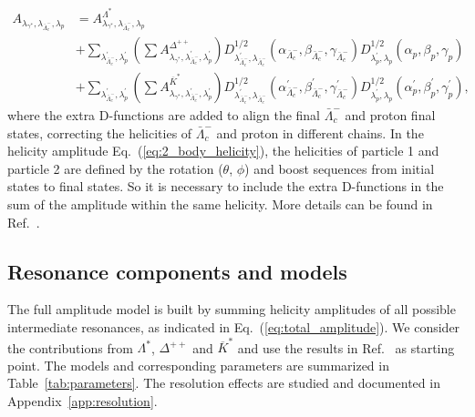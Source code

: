 \begin{equation}\label{eq:total_amplitude}
    \begin{split}
    A_{\lambda_{\gamma^*},\lambda_{\bar{\Lambda}_c^{-}}, \lambda_p} &=  A_{\lambda_{\gamma^*},\lambda_{\bar{\Lambda}_c^{-}},\lambda_p}^{\Lambda^*} \\
    &+ \sum_{\lambda^{\prime}_{\bar{\Lambda}_c^-},\lambda^{\prime}_p}(\sum A_{\lambda_{\gamma^*},\lambda^{\prime}_{\bar{\Lambda}_c^{-}},\lambda^{\prime}_p}^{\Delta^{++}})D_{\lambda^{\prime}_{\bar{\Lambda}_c^-}, \lambda_{\bar{\Lambda}_c^-}}^{1/2}(\alpha_{\bar{\Lambda}_c^-}, \beta_{\bar{\Lambda}_c^-}, \gamma_{\bar{\Lambda}_c^-})D_{\lambda^{\prime}_{p}, \lambda_{p}}^{1/2}(\alpha_{p}, \beta_{p}, \gamma_{p})\\
    &+ \sum_{\lambda^{\prime}_{\bar{\Lambda}_c^-},\lambda^{\prime}_p}(\sum A_{\lambda_{\gamma^*},\lambda^{\prime}_{\bar{\Lambda}_c^{-}},\lambda^{\prime}_p}^{\overline{K}^*})D_{\lambda^{\prime}_{\bar{\Lambda}_c^-}, \lambda_{\bar{\Lambda}_c^-}}^{1/2}(\alpha^{\prime}_{\bar{\Lambda}_c^-}, \beta^{\prime}_{\bar{\Lambda}_c^-}, \gamma^{\prime}_{\bar{\Lambda}_c^-})D_{\lambda^{\prime}_{p}, \lambda_{p}}^{1/2}(\alpha^{\prime}_{p}, \beta^{\prime}_{p}, \gamma^{\prime}_{p}),
    \end{split}
\end{equation}
where the extra D-functions are added to align the final $\bar{\Lambda}_c^-$ and proton final states, correcting the helicities of $\bar{\Lambda}_c^-$ and proton in different chains. In the helicity amplitude Eq.~(\ref{eq:2_body_helicity}), the helicities of particle 1 and particle 2 are defined by the rotation ($\theta$, $\phi$) and boost sequences from initial states to final states. So it is necessary to include the extra D-functions in the sum of the amplitude within the same helicity. More details can be found in Ref.~\cite{BESIII:2022udq}.

\subsection{Resonance components and models}
\label{sec:resonances}
The full amplitude model is built by summing helicity amplitudes of all possible intermediate resonances, as indicated in Eq.~(\ref{eq:total_amplitude}). We consider the contributions from $\Lambda^*$, $\Delta^{++}$ and $\overline{K}^*$ and use the results in Ref.~\cite{LHCb:2022ouv} as starting point. The models and corresponding parameters are summarized in Table~\ref{tab:parameters}. The resolution effects are studied and documented in Appendix~\ref{app:resolution}.

